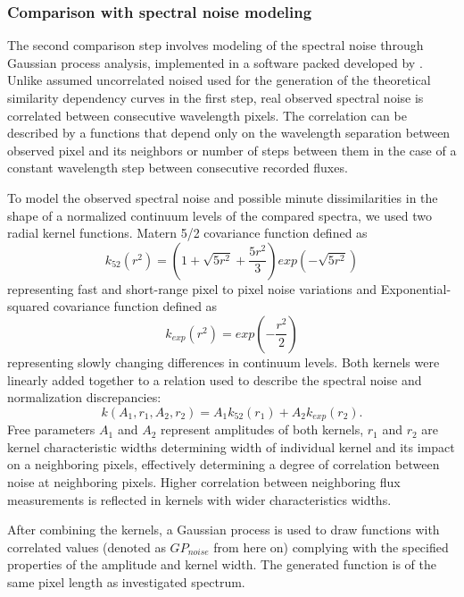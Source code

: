 \subsubsection{Comparison with spectral noise modeling}
The second comparison step involves modeling of the spectral noise through Gaussian process analysis, implemented in a software packed developed by \cite{hodlr}. Unlike assumed uncorrelated noised used for the generation of the theoretical similarity dependency curves in the first step, real observed spectral noise is correlated between consecutive wavelength pixels. The correlation can be described by a functions that depend only on the wavelength separation between observed pixel and its neighbors or number of steps between them in the case of a constant wavelength step between consecutive recorded fluxes.

To model the observed spectral noise and possible minute dissimilarities in the shape of a normalized continuum levels of the compared spectra, we used two radial kernel functions. Matern 5/2 covariance function defined as
\begin{equation}
k_{52}(r^2) = (1 + \sqrt{5 r^2} + \frac{5 r^2}{3}) exp(-\sqrt{5 r^2})
\end{equation}
representing fast and short-range pixel to pixel noise variations and Exponential-squared covariance function defined as
\begin{equation}
k_{exp}(r^2) = exp(-\frac{r^2}{2})
\end{equation}
representing slowly changing differences in continuum levels. Both kernels were linearly added together to a relation used to describe the spectral noise and normalization discrepancies:
\begin{equation}
k(A_1, r_1, A_2, r_2) = A_1 k_{52}(r_1) + A_2 k_{exp}(r_2).
\label{equ:gp_noise}
\end{equation}
Free parameters $A_1$ and $A_2$ represent amplitudes of both kernels, $r_1$ and $r_2$ are kernel characteristic widths determining width of individual kernel and its impact on a neighboring pixels, effectively determining a degree of correlation between noise at neighboring pixels. Higher correlation between neighboring flux measurements is reflected in kernels with wider characteristics widths.

After combining the kernels, a Gaussian process is used to draw functions with correlated values (denoted as $GP_{noise}$ from here on) complying with the specified properties of the amplitude and kernel width. The generated function is of the same pixel length as investigated spectrum. 

